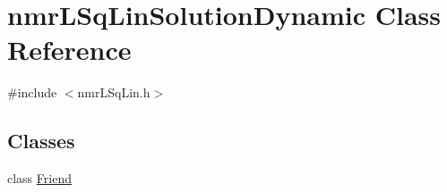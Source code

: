 \hypertarget{classnmr_l_sq_lin_solution_dynamic}{\section{nmr\-L\-Sq\-Lin\-Solution\-Dynamic Class Reference}
\label{classnmr_l_sq_lin_solution_dynamic}
}


{\ttfamily \#include $<$nmr\-L\-Sq\-Lin.\-h$>$}

\subsection*{Classes}
\begin{DoxyCompactItemize}
\item 
class \hyperlink{classnmr_l_sq_lin_solution_dynamic_1_1_friend}{Friend}
\end{DoxyCompactItemize}
